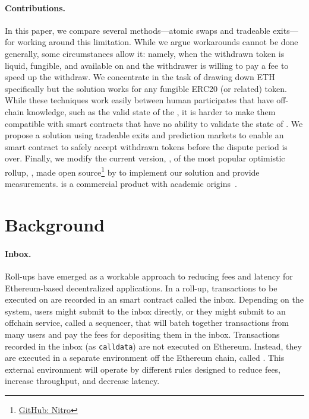 \paragraph{Contributions.} In this paper, we compare several methods---atomic swaps and tradeable exits---for working around this limitation. While we argue workarounds cannot be done generally, some circumstances allow it: namely, when the withdrawn token is liquid, fungible, and available on \layerone and the withdrawer is willing to pay a fee to speed up the withdraw. We concentrate in the task of drawing down ETH specifically but the solution works for any fungible ERC20 (or related) token. While these techniques work easily between human participates that have off-chain knowledge, such as the valid state of the \layertwo, it is harder to make them compatible with \layerone smart contracts that have no ability to validate the state of \layertwo. We propose a solution using tradeable exits and prediction markets to enable an \layerone smart contract to safely accept withdrawn tokens before the dispute period is over. Finally, we modify the current version, \nitro, of the most popular optimistic rollup, \arb, made open source\footnote{\href{https://}{GitHub: Nitro}} by \offchain to implement our solution and provide measurements. \arb is a commercial product with academic origins~\cite{kalodner2018arbitrum}.
 

\section{Background} 

\paragraph{Inbox.} Roll-ups have emerged as a workable approach to reducing fees and latency for Ethereum-based decentralized applications. In a roll-up,  transactions to be executed on \layertwo are recorded in an \layerone smart contract called the inbox. Depending on the system, users might submit to the inbox directly, or they might submit to an offchain service, called a sequencer, that will batch together transactions from many users and pay the \layerone fees for depositing them in the inbox. Transactions recorded in the inbox (as \texttt{calldata}) are not executed on Ethereum. Instead, they are executed in a separate environment off the Ethereum chain, called \layertwo. This external environment will operate by different rules designed to reduce fees, increase throughput, and decrease latency. 

